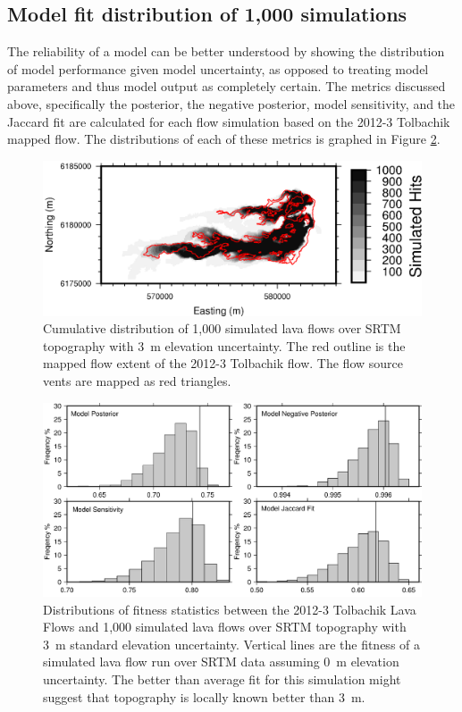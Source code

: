 \documentclass[12pt,letter]{article}
\begin{document}
\subsection{Model fit distribution of 1,000 simulations}
The reliability of a model can be better understood by showing the distribution of model performance given model uncertainty, as opposed to treating model parameters and thus model output as completely certain. The metrics discussed above, specifically the posterior, the negative posterior, model sensitivity, and the Jaccard fit are calculated for each flow simulation based on the 2012-3 Tolbachik mapped flow. The distributions of each of these metrics is graphed in Figure \ref{fig:MC_dist}.

\begin{figure}
\centering
\includegraphics[width=0.7\linewidth]{figures/MC_map}
\caption{Cumulative distribution of 1,000 simulated lava flows over SRTM topography with 3~m elevation uncertainty. The red outline is the mapped flow extent of the 2012-3 Tolbachik flow. The flow source vents are mapped as red triangles.}
\label{fig:MC_map}
\end{figure}

\begin{figure}
\centering
\includegraphics[width=0.7\linewidth]{figures/bayes_graphs}
\caption{Distributions of fitness statistics between the 2012-3 Tolbachik Lava Flows and 1,000 simulated lava flows over SRTM topography with 3~m standard elevation uncertainty. Vertical lines are the fitness of a simulated lava flow run over SRTM data assuming 0~m elevation uncertainty. The better than average fit for this simulation might suggest that topography is locally known better than 3~m.}
\label{fig:MC_dist}
\end{figure}
\end{document}
